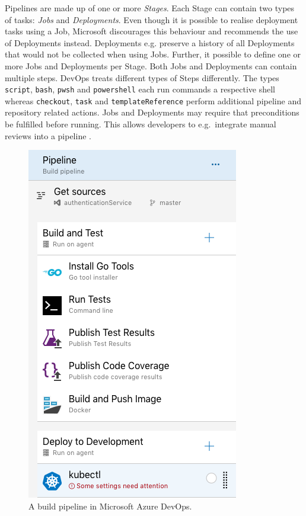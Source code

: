 Pipelines are made up of one or more \textit{Stages}. Each Stage can contain
two types of tasks: \textit{Jobs} and \textit{Deployments}. Even though it is
possible to realise deployment tasks using a Job, Microsoft discourages this
behaviour and recommends the use of Deployments instead. Deployments e.g.
preserve a history of all Deployments that would not be collected when using
Jobs.  Further, it possible to define one or more Jobs and Deployments per
Stage. Both Jobs and Deployments can contain multiple steps. DevOps treats
different types of Steps differently. The types \texttt{script}, \texttt{bash},
\texttt{pwsh} and \texttt{powershell} each run commands a respective shell
whereas \texttt{checkout}, \texttt{task} and \texttt{templateReference} perform
additional pipeline and repository related actions. Jobs and Deployments may
require that preconditions be fulfilled before running. This allows developers
to e.g.\ integrate manual reviews into a pipeline \autocite{MicrosoftJobs2019}.

\begin{figure}[H]
\begin{center}
  \includegraphics[scale=0.6]{images/figures/azure_devops_build_pipeline.png}
\end{center}
\caption{A build pipeline in Microsoft Azure DevOps.}%
\label{fig:build_pipeline_azure}
\end{figure}

